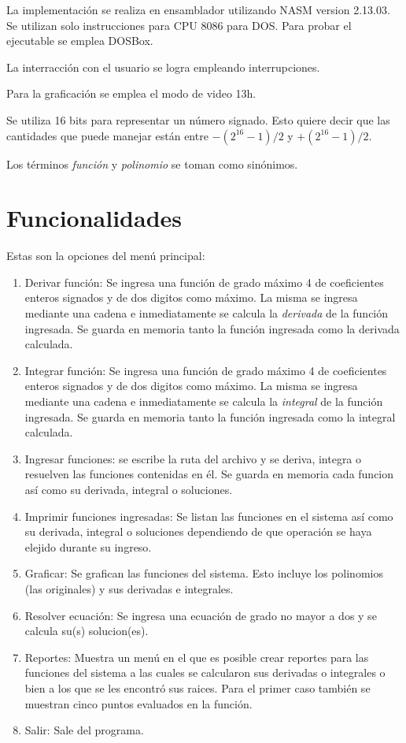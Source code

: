\documentclass[journal]{../../IEEEtran/IEEEtran}
\begin{document}
La implementación se realiza en ensamblador utilizando NASM version
2.13.03. Se utilizan solo instrucciones para CPU 8086 para DOS. Para
probar el ejecutable se emplea DOSBox.

La interracción con el usuario se logra empleando interrupciones.

Para la graficación se emplea el modo de video 13h.

Se utiliza 16 bits para representar un número signado. Esto quiere
decir que las cantidades que puede manejar están entre $-(2^{16}-1)/2$
y $+(2^{16}-1)/2$.

Los términos \textit{función} y \textit{polinomio} se toman como
sinónimos.

\section{Funcionalidades}
Estas son la opciones del menú principal:

\begin{enumerate}
\item Derivar función: Se ingresa una función de grado máximo 4 de
  coeficientes enteros signados y de dos digitos como máximo. La misma
  se ingresa mediante una cadena e inmediatamente se calcula la
  \textit{derivada} de la función ingresada. Se guarda en memoria
  tanto la función ingresada como la derivada calculada.
\item Integrar función: Se ingresa una función de grado máximo 4 de
  coeficientes enteros signados y de dos digitos como máximo. La misma
  se ingresa mediante una cadena e inmediatamente se calcula la
  \textit{integral} de la función ingresada. Se guarda en memoria
  tanto la función ingresada como la integral calculada.
\item Ingresar funciones: se escribe la ruta del archivo y se deriva,
  integra o resuelven las funciones contenidas en él. Se guarda en
  memoria cada funcion así como su derivada, integral o soluciones.
\item Imprimir funciones ingresadas: Se listan las funciones en el
  sistema así como su derivada, integral o soluciones dependiendo de
  que operación se haya elejido durante su ingreso.
\item Graficar: Se grafican las funciones del sistema. Esto incluye
  los polinomios (las originales) y sus derivadas e integrales.
\item Resolver ecuación: Se ingresa una ecuación de grado no mayor a
  dos y se calcula su(s) solucion(es).
\item Reportes: Muestra un menú en el que es posible crear reportes
  para las funciones del sistema a las cuales se calcularon sus
  derivadas o integrales o bien a los que se les encontró sus
  raices. Para el primer caso también se muestran cinco puntos
  evaluados en la función.
\item Salir: Sale del programa.
\end{enumerate}
\end{document}
